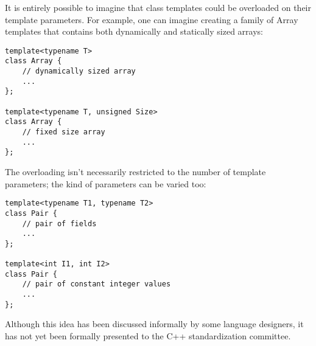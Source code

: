 It is entirely possible to imagine that class templates could be overloaded on their template parameters. For example, one can imagine creating a family of Array templates that contains both dynamically and statically sized arrays:

\begin{lstlisting}[style=styleCXX]
template<typename T>
class Array {
	// dynamically sized array
	...
};

template<typename T, unsigned Size>
class Array {
	// fixed size array
	...
};
\end{lstlisting}

The overloading isn’t necessarily restricted to the number of template parameters; the kind of parameters can be varied too:

\begin{lstlisting}[style=styleCXX]
template<typename T1, typename T2>
class Pair {
	// pair of fields
	...
};

template<int I1, int I2>
class Pair {
	// pair of constant integer values
	...
};
\end{lstlisting}

Although this idea has been discussed informally by some language designers, it has not yet been formally presented to the C++ standardization committee.











































